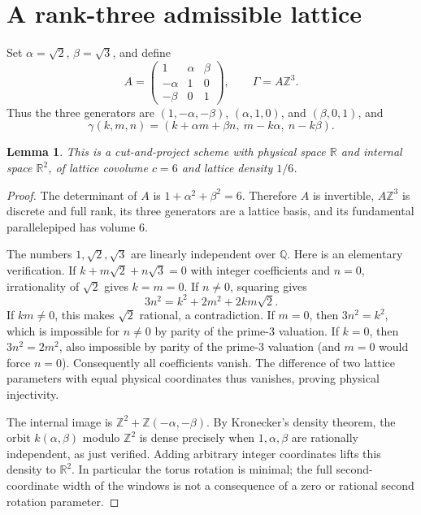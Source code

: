\documentclass[11pt]{article}
\newtheorem{lemma}[theorem]{Lemma}
\newcommand{\R}{\mathbb R}
\newcommand{\Z}{\mathbb Z}
\begin{document}
\section{A rank-three admissible lattice}
Set $\alpha=\sqrt2$, $\beta=\sqrt3$, and define
\[
 A=\begin{pmatrix}1&\alpha&\beta\\-\alpha&1&0\\-\beta&0&1\end{pmatrix},
 \qquad \Gamma=A\Z^3.
\]
Thus the three generators are $(1,-\alpha,-\beta)$,
$(\alpha,1,0)$, and $(\beta,0,1)$, and
\[
\gamma(k,m,n)=(k+\alpha m+\beta n,\ m-k\alpha,\ n-k\beta).
                                                        \tag{2}
\]
\begin{lemma}\label{lem:scheme}
This is a cut-and-project scheme with physical space $\R$ and internal
space $\R^2$, of lattice covolume $c=6$ and lattice density $1/6$.
\end{lemma}
\begin{proof}
The determinant of $A$ is $1+\alpha^2+\beta^2=6$. Therefore $A$ is
invertible, $A\Z^3$ is discrete and full rank, its three generators are
a lattice basis, and its fundamental parallelepiped has volume $6$.

The numbers $1,\sqrt2,\sqrt3$ are linearly independent over $\mathbb Q$.
Here is an elementary verification. If
$k+m\sqrt2+n\sqrt3=0$ with integer coefficients and $n=0$, irrationality
of $\sqrt2$ gives $k=m=0$. If $n\ne0$, squaring gives
\[
3n^2=k^2+2m^2+2km\sqrt2.
\]
If $km\ne0$, this makes $\sqrt2$ rational, a contradiction. If $m=0$,
then $3n^2=k^2$, which is impossible for $n\ne0$ by parity of the
prime-$3$ valuation. If $k=0$, then $3n^2=2m^2$, also impossible by
parity of the prime-$3$ valuation (and $m=0$ would force $n=0$).
Consequently all coefficients vanish. The difference of two lattice
parameters with equal physical coordinates thus vanishes, proving
physical injectivity.

The internal image is
$\Z^2+\Z(-\alpha,-\beta)$. By Kronecker's density theorem, the orbit
$k(\alpha,\beta)$ modulo $\Z^2$ is dense precisely when
$1,\alpha,\beta$ are rationally independent, as just verified.
Adding arbitrary integer coordinates lifts this density to $\R^2$.
In particular the torus rotation is minimal; the full second-coordinate
width of the windows is not a consequence of a zero or rational
second rotation parameter.
\end{proof}
\end{document}
